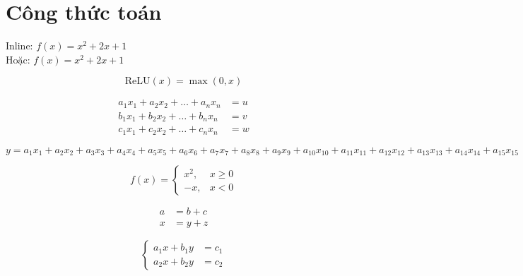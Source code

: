 \section{Công thức toán}

Inline: \( f(x) = x^2 + 2x + 1 \)\\
\indent Hoặc: $f(x) = x^2 + 2x + 1$

\[
    \text{ReLU}(x) = \max(0, x)
\]

\begin{equation}
    \begin{aligned}
        a_1x_1 + a_2x_2 + \dots + a_nx_n & = u \\
        b_1x_1 + b_2x_2 + \dots + b_nx_n & = v \\
        c_1x_1 + c_2x_2 + \dots + c_nx_n & = w
    \end{aligned}
\end{equation}

\begin{dmath}
    y = a_1x_1 + a_2x_2 + a_3x_3 + a_4x_4 + a_5x_5 + a_6x_6
      + a_7x_7 + a_8x_8 + a_9x_9 + a_{10}x_{10} + a_{11}x_{11}
      + a_{12}x_{12} + a_{13}x_{13} + a_{14}x_{14} + a_{15}x_{15}
\end{dmath}

\begin{equation}
    f(x) =
    \begin{cases}
        x^2, & x \ge 0 \\
        -x,  & x < 0
    \end{cases}
\end{equation}

\begin{align}
    a & = b + c \\
    x & = y + z
\end{align}

\begin{equation}
    \left\{
    \begin{aligned}
        a_1x + b_1y & = c_1 \\
        a_2x + b_2y & = c_2
    \end{aligned}
    \right.
\end{equation}
